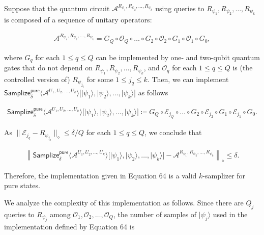 Suppose that the quantum circuit $\mathcal{A}^{R_{\psi_{1}},R_{\psi_{2}},\dots,R_{\psi_{k}}}$ using queries to $R_{\psi_{1}},R_{\psi_{2}},\dots,R_{\psi_{k}}$ is composed of a sequence of unitary operators:\par


\[\begin{gathered}
\mathcal{A}^{R_{\psi_{1}},R_{\psi_{2}},\dots,R_{\psi_{k}}}=G_{Q}\circ\mathcal{O}_{Q}\circ\dots\circ G_{2}\circ\mathcal{O}_{2}\circ G_{1}\circ\mathcal{O}_{1}\circ G_{0},
\end{gathered}\]


where $G_{q}$ for each $1\leq q\leq Q$ can be implemented by one- and two-qubit quantum gates that do not depend on $R_{\psi_{1}},R_{\psi_{2}},\dots,R_{\psi_{k}}$, and $\mathcal{O}_{q}$ for each $1\leq q\leq Q$ is (the controlled version of) $R_{\psi_{j_{q}}}$ for some $1\leq j_{q}\leq k$.
Then, we can implement $\mathsf{Samplize}^{\mathsf{pure}}_{\delta}\big\langle\mathcal{A}^{U_{1},U_{2},\dots,U_{k}}\big\rangle\big[\lvert\psi_{1}\rangle,\lvert\psi_{2}\rangle,\dots,\lvert\psi_{k}\rangle\big]$ as follows\par


\[\begin{gathered}
\mathsf{Samplize}^{\mathsf{pure}}_{\delta}\big\langle\mathcal{A}^{U_{1},U_{2},\dots,U_{k}}\big\rangle\big[\lvert\psi_{1}\rangle,\lvert\psi_{2}\rangle,\dots,\lvert\psi_{k}\rangle\big]\coloneqq G_{Q}\circ\mathcal{E}_{j_{Q}}\circ\dots\circ G_{2}\circ\mathcal{E}_{j_{2}}\circ G_{1}\circ\mathcal{E}_{j_{1}}\circ G_{0}.
\end{gathered}\]


As $\lVert\mathcal{E}_{j_{q}}-R_{\psi_{j_{q}}}\rVert_{\diamond}\leq\delta/Q$ for each $1\leq q\leq Q$, we conclude that\par


\[\begin{gathered}
\left\lVert\mathsf{Samplize}^{\mathsf{pure}}_{\delta}\big\langle\mathcal{A}^{U_{1},U_{2},\dots,U_{k}}\big\rangle\big[\lvert\psi_{1}\rangle,\lvert\psi_{2}\rangle,\dots,\lvert\psi_{k}\rangle\big]-\mathcal{A}^{R_{\psi_{1}},R_{\psi_{2}},\dots,R_{\psi_{k}}}\right\rVert_{\diamond}\leq\delta.
\end{gathered}\]


Therefore, the implementation given in Equation 64 is a valid $k$-samplizer for pure states.\par




We analyze the complexity of this implementation as follows.
Since there are $Q_{j}$ queries to $R_{\psi_{j}}$ among $\mathcal{O}_{1},\mathcal{O}_{2},\dots,\mathcal{O}_{Q}$, the number of samples of $\lvert\psi_{j}\rangle$ used in the implementation defined by Equation 64 is\par


